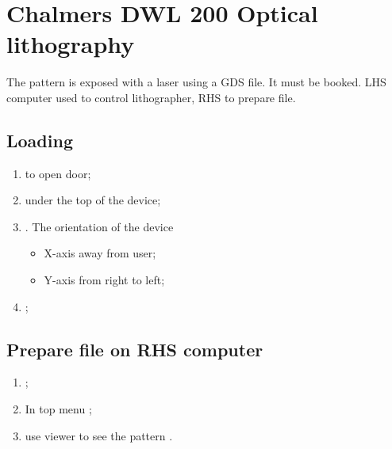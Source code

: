
\section{Chalmers DWL 200 Optical lithography\label{sec:DWL200}}
The pattern is exposed with  a laser using a GDS file. It must  be booked.  {LHS computer used
  to control lithographer}, RHS to prepare file.
  
\subsection{Loading}

\begin{enumerate}
\item {} to open door;
\item {} under the top of the device;
\item {}. The orientation of the device
  \begin{itemize}
  \item X-axis away from user;
  \item Y-axis from right to left;
  \end{itemize}
\item {};
\end{enumerate}
 
\subsection{Prepare file on RHS computer}
\begin{enumerate}
\item {} \ra {} \ra {} \ra {};
\item In top menu \ra {} \ra {};
\item {}\ra use viewer to  see the pattern \ra {}.
\end{enumerate}
 
 
